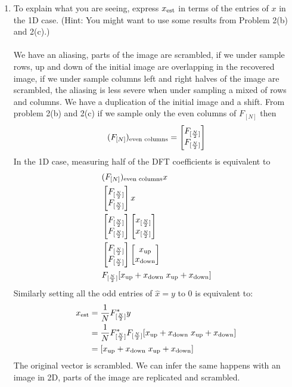\documentclass[12pt,twoside]{article}
\begin{document}
\begin{enumerate}
\begin{enumerate}
  \item To explain what you are seeing, express $x_{\operatorname{est}}$ in terms of the entries of $x$ in the 1D case. (Hint:   You might want to use some results from Problem 2(b) and 2(c).)\\ \\
  We have an aliasing, parts of the image are scrambled, if we under sample rows, up and down of the initial image are overlapping in the recovered  image, if we under sample columns
  left and right halves of the image are scrambled, the aliasing is less severe when under sampling a mixed of rows and columns. We have a duplication of the initial image and a shift. 
  From problem 2(b) and 2(c) if we sample only the even columns of $F_{[N]}$ then 
  $$
  (F_{[N]})_{\text{even columns}} =
  \begin{bmatrix} 
  F_{[\frac{N}{2}]} \\
   F_{[\frac{N}{2}]}  \end{bmatrix}$$
 In the 1D case, measuring half of the DFT coefficients is equivalent to 
 \begin{align*}
& (F_{[N]})_{\text{even columns}} x \\
&  \begin{bmatrix} 
  F_{[\frac{N}{2}]} \\
   F_{[\frac{N}{2}]}  \end{bmatrix} x \\
  & \begin{bmatrix} 
  F_{[\frac{N}{2}]} \\
   F_{[\frac{N}{2}]}  \end{bmatrix} 
   \begin{bmatrix}  x_{[\frac{N}{2}]} \\  x_{[\frac{N}{2}]} \end{bmatrix} \\
  & \begin{bmatrix} 
  F_{[\frac{N}{2}]} \\
   F_{[\frac{N}{2}]}  \end{bmatrix} 
   \begin{bmatrix}  x_{\text{up}} \\  x_{\text{down}} \end{bmatrix} \\
  &  F_{[\frac{N}{2}]}  [x_{\text{up}} + x_{\text{down}} \; x_{\text{up}} + x_{\text{down}}]\\
 \end{align*}
 Similarly setting all the odd entries of $\hat{x} = y$ to $0$ is equivalent to:
 \begin{align*}
 x_{\operatorname{est}} 	&=  \frac{1}{N}F_{[\frac{N}{2}]}^{\ast} y \\
 			&=  \frac{1}{N}F_{[\frac{N}{2}]}^{\ast}   F_{[\frac{N}{2}]}   [x_{\text{up}} + x_{\text{down}} \; x_{\text{up}} + x_{\text{down}}] \\
			&=   [x_{\text{up}} + x_{\text{down}} \; x_{\text{up}} + x_{\text{down}}]
  \end{align*}
The original vector is scrambled. We can infer the same happens with an image in 2D, parts of the image are replicated and scrambled.

  \end{enumerate}

 \end{enumerate}
\end{document}
